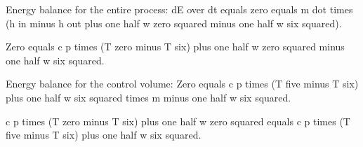Energy balance for the entire process:
dE over dt equals zero equals m dot times (h in minus h out plus one half w zero squared minus one half w six squared).

Zero equals c p times (T zero minus T six) plus one half w zero squared minus one half w six squared.

Energy balance for the control volume:
Zero equals c p times (T five minus T six) plus one half w six squared times m minus one half w six squared.

c p times (T zero minus T six) plus one half w zero squared equals c p times (T five minus T six) plus one half w six squared.